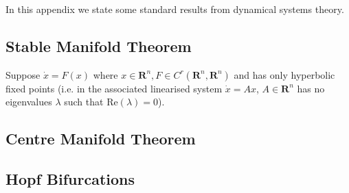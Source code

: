 In this appendix we state some standard results from dynamical systems theory.
\subsection{Stable Manifold Theorem}
Suppose $\dot{x} = F(x)$ where $x\in \mathbf{R}^n, F\in C^r(\mathbf{R}^n,\mathbf{R}^n)$ and has only hyperbolic fixed points (i.e. in the associated linearised system $\dot{x}=Ax$, $A\in \mathbf{R}^n$ has no eigenvalues $\lambda$ such that $\mathrm{Re}(\lambda)=0$). 
\subsection{Centre Manifold Theorem}
\subsection{Hopf Bifurcations}